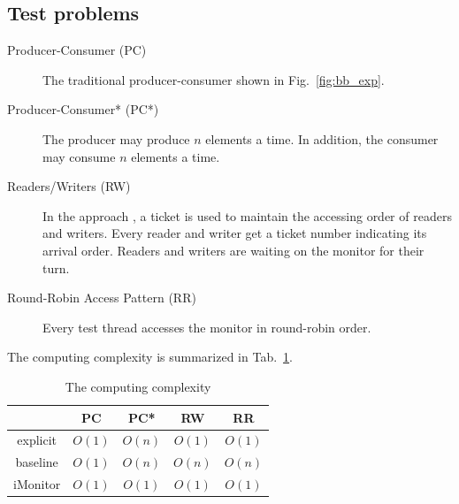 \documentclass[preprint]{sigplanconf}
\begin{document}
\subsection{Test problems}
\begin{description}
    \item[Producer-Consumer (PC)] The traditional producer-consumer shown in 
        Fig.~\ref{fig:bb_exp}.
    \item[Producer-Consumer* (PC*)] The producer may produce $n$ elements a 
        time. In addition, the consumer may consume $n$ elements a time.
    \item[Readers/Writers (RW)] In the approach \cite{bh05}, a ticket is used
        to maintain the accessing order of readers and writers. Every reader
        and writer get a ticket number indicating its arrival order. Readers
        and writers are waiting on the monitor for their turn. 
    \item[Round-Robin Access Pattern (RR)] Every test thread accesses the
        monitor in round-robin order. 
\end{description}

The computing complexity is summarized in Tab.~\ref{tab:complexity}.
\begin{table}
   \centering
   \begin{tabular}{|c||c|c|c|c|}
      \hline 
         & PC & PC* & RW & RR \\
      \hline 
      explicit & $O(1)$ & $O(n)$ & $O(1)$ & $O(1)$ \\
      \hline 
      baseline & $O(1)$ & $O(n)$ & $O(n)$ & $O(n)$ \\
      \hline 
      iMonitor & $O(1)$ & $O(1)$ & $O(1)$ & $O(1)$ \\
      \hline 
   \end{tabular}
   \caption{The computing complexity}
   \label{tab:complexity}
\end{table}
\end{document}
